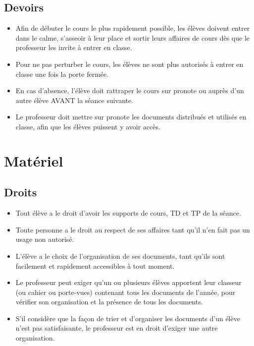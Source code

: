 \documentclass[11pt]{article}
\begin{document}
\subsection{Devoirs}
\begin{itemize}
    \item Afin de débuter le cours le plus rapidement possible, les élèves doivent entrer dans le calme, s'asseoir à leur place et sortir leurs affaires de cours dès que le professeur les invite à entrer en classe.
    \item Pour ne pas perturber le cours, les élèves ne sont plus autorisés à entrer en classe une fois la porte fermée.
    \item En cas d'absence, l'élève doit rattraper le cours sur pronote ou auprès d'un autre élève AVANT la séance suivante.
    \item Le professeur doit mettre sur pronote les documents distribués et utilisés en classe, afin que les élèves puissent y avoir accès.
\end{itemize}

\section{Matériel}
\subsection{Droits}
\begin{itemize}
    \item Tout élève a le droit d'avoir les supports de cours, TD et TP de la séance.
    \item Toute personne a le droit au respect de ses affaires tant qu'il n'en fait pas un usage non autorisé.
    \item L'élève a le choix de l'organisation de ses documents, tant qu'ils sont facilement et rapidement accessibles à tout moment.
    \item Le professeur peut exiger qu'un ou plusieurs élèves apportent leur classeur (ou cahier ou porte-vues) contenant tous les documents de l'année, pour vérifier son organisation et la présence de tous les documents.
    \item S'il considère que la façon de trier et d'organiser les documents d'un élève n'est pas satisfaisante, le professeur est en droit d'exiger une autre organisation.
\end{itemize}
\end{document}
